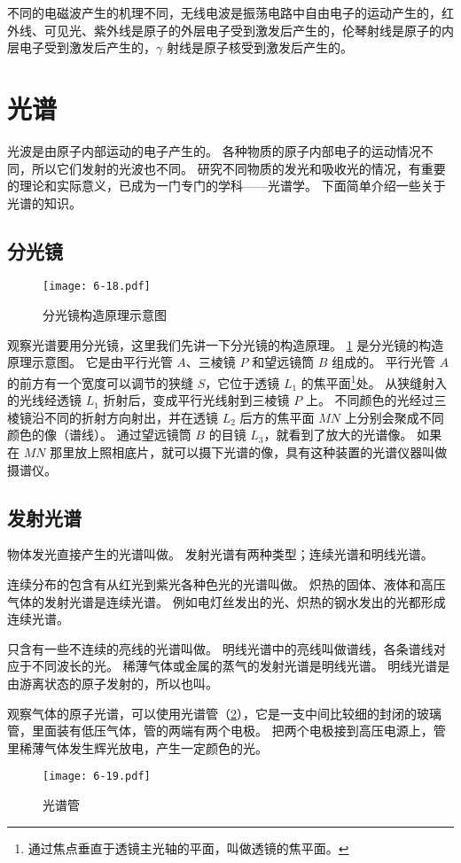 不同的电磁波产生的机理不同，无线电波是振荡电路中自由电子的运动产生的，红外线、可见光、紫外线是原子的外层电子受到激发后产生的，伦琴射线是原子的内层电子受到激发后产生的，$\gamma$ 射线是原子核受到激发后产生的。

\section{光谱}
光波是由原子内部运动的电子产生的。
各种物质的原子内部电子的运动情况不同，所以它们发射的光波也不同。
研究不同物质的发光和吸收光的情况，有重要的理论和实际意义，已成为一门专门的学科——光谱学。
下面简单介绍一些关于光谱的知识。

\subsection{分光镜}
\begin{figure}
  \texttt{[image: 6-18.pdf]}
  \caption{分光镜构造原理示意图}\label{fig:6-18}
\end{figure}

观察光谱要用分光镜，这里我们先讲一下分光镜的构造原理。
\cref{fig:6-18} 是分光镜的构造原理示意图。
它是由平行光管 $A$、三棱镜 $P$ 和望远镜筒 $B$ 组成的。
平行光管 $A$ 的前方有一个宽度可以调节的狭缝 $S$，它位于透镜 $L_1$ 的焦平面\footnote{通过焦点垂直于透镜主光轴的平面，叫做透镜的焦平面。}处。
从狭缝射入的光线经透镜 $L_1$ 折射后，变成平行光线射到三棱镜 $P$ 上。
不同颜色的光经过三棱镜沿不同的折射方向射出，并在透镜 $L_2$ 后方的焦平面 $MN$ 上分别会聚成不同颜色的像（谱线）。
通过望远镜筒 $B$ 的目镜 $L_3$，就看到了放大的光谱像。
如果在 $MN$ 那里放上照相底片，就可以摄下光谱的像，具有这种装置的光谱仪器叫做摄谱仪。

\subsection{发射光谱}
物体发光直接产生的光谱叫做。
发射光谱有两种类型；连续光谱和明线光谱。

连续分布的包含有从红光到紫光各种色光的光谱叫做。
炽热的固体、液体和高压气体的发射光谱是连续光谱。
例如电灯丝发出的光、炽热的钢水发出的光都形成连续光谱。

只含有一些不连续的亮线的光谱叫做。
明线光谱中的亮线叫做谱线，各条谱线对应于不同波长的光。
稀薄气体或金属的蒸气的发射光谱是明线光谱。
明线光谱是由游离状态的原子发射的，所以也叫。

观察气体的原子光谱，可以使用光谱管（\cref{fig:6-19}），它是一支中间比较细的封闭的玻璃管，里面装有低压气体，管的两端有两个电极。
把两个电极接到高压电源上，管里稀薄气体发生辉光放电，产生一定颜色的光。
\begin{figure}
  \texttt{[image: 6-19.pdf]}
  \caption{光谱管}\label{fig:6-19}
\end{figure}

